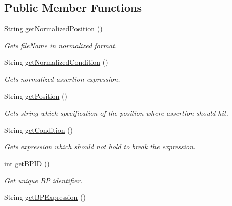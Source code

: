 \subsection*{Public Member Functions}
\begin{DoxyCompactItemize}
\item 
String \hyperlink{interfacegov_1_1nasa_1_1jpf_1_1inspector_1_1interfaces_1_1_assert_status_a0d2fcef9f5f25d8241e0109814416458}{get\+Normalized\+Position} ()
\begin{DoxyCompactList}\small\item\em Gets file\+Name in normalized format. \end{DoxyCompactList}\item 
String \hyperlink{interfacegov_1_1nasa_1_1jpf_1_1inspector_1_1interfaces_1_1_assert_status_ae3d4b293750a5334ea0249eae08d1365}{get\+Normalized\+Condition} ()
\begin{DoxyCompactList}\small\item\em Gets normalized assertion expression. \end{DoxyCompactList}\item 
String \hyperlink{interfacegov_1_1nasa_1_1jpf_1_1inspector_1_1interfaces_1_1_assert_create_a61a47b677f13657fc7d6b81d605c8133}{get\+Position} ()
\begin{DoxyCompactList}\small\item\em Gets string which specification of the position where assertion should hit. \end{DoxyCompactList}\item 
String \hyperlink{interfacegov_1_1nasa_1_1jpf_1_1inspector_1_1interfaces_1_1_assert_create_a69127890ec21b8d0e8ca77c146196211}{get\+Condition} ()
\begin{DoxyCompactList}\small\item\em Gets expression which should not hold to break the expression. \end{DoxyCompactList}\item 
int \hyperlink{interfacegov_1_1nasa_1_1jpf_1_1inspector_1_1interfaces_1_1_break_point_creation_information_a261d8c7de48f0776fbe0b4222c568070}{get\+B\+P\+ID} ()
\begin{DoxyCompactList}\small\item\em Get unique BP identifier. \end{DoxyCompactList}\item 
String \hyperlink{interfacegov_1_1nasa_1_1jpf_1_1inspector_1_1interfaces_1_1_break_point_creation_information_aa7da9b019da9ee304abd59759f73d14e}{get\+B\+P\+Expression} ()

\end{DoxyCompactItemize}

